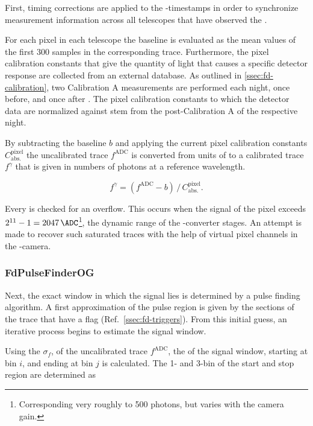 First, timing corrections are applied to the \FD-\TTWO timestamps in order to 
synchronize measurement information across all telescopes that have observed 
the \EAS. 

For each pixel in each telescope the baseline is evaluated as the mean \ADC 
values of the first 300 samples in the corresponding \PMT trace. Furthermore, 
the pixel calibration constants that give the quantity of light that causes a 
specific \ADC detector response are collected from an external database. As 
outlined in \cref{ssec:fd-calibration}, two Calibration A measurements are 
performed each night, once before, and once after \DAQ. The pixel calibration
constants to which the detector data are normalized against stem from the 
post-\DAQ Calibration A of the respective night.

By subtracting the baseline $b$ and applying the current pixel calibration 
constants $C_\mathrm{abs.}^\mathrm{pixel}$ the uncalibrated trace 
$f^\mathrm{ADC}$ is converted from units of \ADC to a calibrated trace 
$f^\gamma$ that is given in numbers of photons at a reference wavelength.

\begin{equation}
\label{eq:fd-calib-equation}
f^\gamma = \left( f^\mathrm{ADC} - b \right)\,/\,C_\mathrm{abs.}^\mathrm{pixel}.
\end{equation}

Every \PMT is checked for an \ADC overflow. This occurs when the \ADC signal of
the pixel exceeds $2^{11} - 1 = 2047\,\ADC$\footnote{Corresponding very roughly
to 500 photons, but varies with the camera gain.}, the dynamic range of the 
\FD-converter stages. An attempt is made to recover such saturated traces with 
the help of virtual pixel channels in the \FD-camera.

\subsubsection{FdPulseFinderOG}
\label{sssec:reconstruction-pulse-finder}

Next, the exact window in which the \EAS signal lies is determined by a pulse 
finding algorithm. A first approximation of the pulse region is given by the 
sections of the trace that have a \FLT flag (Ref.\ \cref{ssec:fd-triggers}). 
From this initial guess, an iterative process begins to estimate the signal 
window.

Using the \RMS $\sigma_f$, of the uncalibrated trace $f^\mathrm{ADC}$, the 
\SN of the signal window, starting at bin $i$, and ending at bin $j$ is 
calculated. The 1- and 3-bin \SN of the start and stop region are determined as

